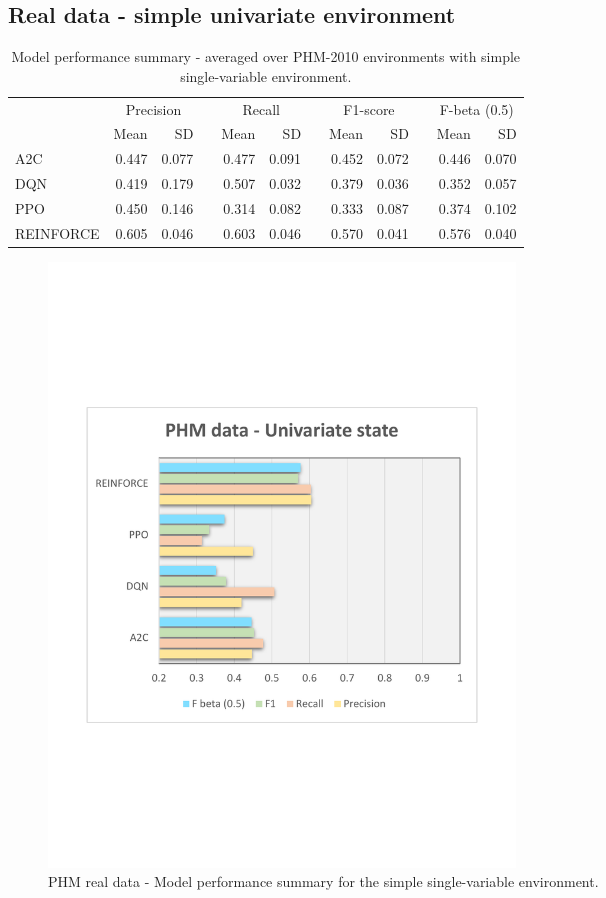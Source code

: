 \documentclass[a4paper, 12pt]{article}
\newcommand{\rowspace}[1]{\renewcommand{\arraystretch}{#1}}
\begin{document}
\subsection{Real data - simple univariate environment}
\begin{table}[h]\centering
	\sffamily
	\rowspace{1.3}
	\begin{tabular}{@{}l rr c rr c rr c rr@{}}
		\arrayrulecolor{black!40}\toprule
		& \multicolumn{2}{c}{Precision} & \phantom{i} & \multicolumn{2}{c}{Recall} & \phantom{i} & \multicolumn{2}{c}{F1-score} & \phantom{i} & \multicolumn{2}{c}{F-beta (0.5)} \\
		\cmidrule{2-3} \cmidrule{5-6} \cmidrule{8-9} \cmidrule{11-12} 
		
		&Mean &SD & &Mean &SD & &Mean &SD& &Mean & SD\\ \midrule
		A2C & 0.447 & 0.077 & &0.477 & 0.091 & & 0.452 & 0.072 & &0.446 &0.070 \\
		DQN & 0.419 & 0.179 & &0.507 & 0.032 & & 0.379 & 0.036 & &0.352 &0.057 \\
		PPO & 0.450 & 0.146 & &0.314 & 0.082 & & 0.333 & 0.087 & &0.374 &0.102 \\
		REINFORCE & \textcolor{dblue}{0.605} & 0.046 & &\textcolor{dblue}{0.603} & 0.046 & & \textcolor{dblue}{0.570} & 0.041 & &\textcolor{dblue}{0.576} &0.040 \\
		
		\bottomrule
	\end{tabular}
	\caption{Model performance summary - averaged over PHM-2010 environments with simple single-variable environment.}
	\label{tbl:PHMSS}
\end{table}
\begin{figure}[h]
	\centering
	\includegraphics[width=0.6\textwidth, trim={1.5cm 7cm 1cm 7cm}]{images/PHMSSPlot.pdf}  
	\caption{PHM real data - Model performance summary for the simple single-variable environment.}
	\label{fig:PHMSS}
\end{figure}
\end{document}
